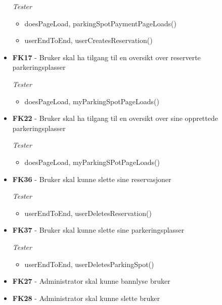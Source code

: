 \documentclass[12pt]{article}
\begin{document}
\begin{itemize}
            \textit{Tester}
            \begin{itemize}
                \item doesPageLoad, parkingSpotPaymentPageLoads()
                \item userEndToEnd, userCreatesReservation()
            \end{itemize}
        
        \item \textbf{FK17} - Bruker skal ha tilgang til en oversikt over reserverte parkeringsplasser
        
            \textit{Tester}
            \begin{itemize}
                \item doesPageLoad, myParkingSpotPageLoads()
            \end{itemize}

        \item \textbf{FK22} - Bruker skal ha tilgang til en oversikt over sine opprettede parkeringsplasser
        
            \textit{Tester}
            \begin{itemize}
                \item doesPageLoad, myParkingSPotPageLoads()
            \end{itemize}

        \item \textbf{FK36} - Bruker skal kunne slette sine reservasjoner
        
            \textit{Tester}
            \begin{itemize}
                \item userEndToEnd, userDeletesReservation()
            \end{itemize}

        \item \textbf{FK37} - Bruker skal kunne slette sine parkeringsplasser
        
            \textit{Tester}
            \begin{itemize}
                \item userEndToEnd, userDeletesParkingSpot()
            \end{itemize}

        \item \textbf{FK27} - Administrator skal kunne bannlyse bruker
        
        \item \textbf{FK28} - Administrator skal kunne slette bruker
        

\end{itemize}
\end{document}
